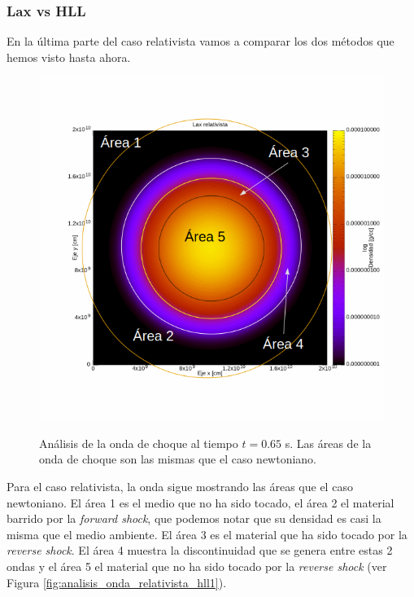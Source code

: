 \documentclass[12pt,a4paper]{book}
\begin{document}
\subsubsection{Lax vs HLL} \label{subs:Lax_vs_HLL_relativista}
En la última parte del caso relativista vamos a comparar los dos métodos que hemos visto hasta ahora.


\begin{figure} 
\centering
{\includegraphics[scale=0.5]{./Figuras/Pruebas/Prueba_onda_choque/Lax-HLL-rel/bwlax-rel65-analisis}}
\caption{\label{fig:analisis_onda_relativista_lax1}Análisis de la onda de choque al tiempo $t = 0.65$ s. Las áreas de la onda de choque son las mismas que el caso newtoniano.}
\end{figure}

Para el caso relativista, la onda sigue mostrando las áreas que el caso newtoniano. El área 1 es el medio que no ha sido tocado, el área 2 el material barrido por la \emph{forward shock}, que podemos notar que su densidad es casi la misma que el medio ambiente. El área 3 es el material que ha sido tocado por la \emph{reverse shock}. El área 4 muestra la discontinuidad que se genera entre estas 2 ondas y el área 5 el material que no ha sido tocado por la \emph{reverse shock} (ver Figura \ref{fig:analisis_onda_relativista_hll1}).
\end{document}
